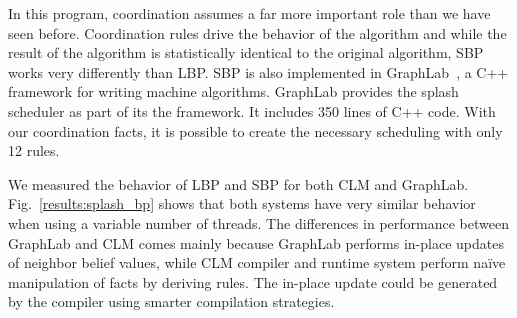 \begin{dblfig}
\begin{center}
   \end{center}
\vspace*{-1ex}
\end{dblfig}

In this program, coordination assumes a far more important role than
we have seen before. Coordination rules drive the behavior of the
algorithm and while the result of the algorithm is statistically
identical to the original algorithm, SBP works very differently than
LBP.  SBP is also implemented in GraphLab~\cite{GraphLab2010}, a C++
framework for writing machine algorithms.  GraphLab provides the
splash scheduler as part of its the framework. It includes 350 lines
of C++ code.  With our coordination facts, it is possible to create
the necessary scheduling with only 12 rules.

We measured the behavior of LBP and SBP for both CLM and GraphLab.
Fig.~\ref{results:splash_bp} shows that both systems have very similar behavior
when using a variable number of threads.  The differences in performance between
GraphLab and CLM comes mainly because GraphLab performs in-place updates of
neighbor belief values, while CLM compiler and runtime system perform na\"{i}ve
manipulation of facts by deriving rules. The in-place update could be generated
by the compiler using smarter compilation strategies.
